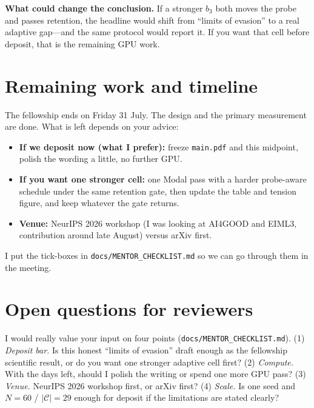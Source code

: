 \documentclass{webofc}
\begin{document}
\textbf{What could change the conclusion.} If a stronger $b_3$ both moves the
probe and passes retention, the headline would shift from ``limits of evasion''
to a real adaptive gap---and the same protocol would report it. If you want
that cell before deposit, that is the remaining GPU work.

\section{Remaining work and timeline}
\label{sec-plan}

The fellowship ends on Friday 31 July. The design and the primary measurement
are done. What is left depends on your advice:
\begin{itemize}
\item \textbf{If we deposit now (what I prefer):} freeze \texttt{main.pdf} and
this midpoint, polish the wording a little, no further GPU.
\item \textbf{If you want one stronger cell:} one Modal pass with a harder
probe-aware schedule under the same retention gate, then update the table and
tension figure, and keep whatever the gate returns.
\item \textbf{Venue:} NeurIPS 2026 workshop (I was looking at AI4GOOD and
EIML3, contribution around late August) versus arXiv first.
\end{itemize}
I put the tick-boxes in \texttt{docs/MENTOR\_CHECKLIST.md} so we can go through
them in the meeting.

\section{Open questions for reviewers}
\label{sec-questions}

I would really value your input on four points
(\texttt{docs/MENTOR\_CHECKLIST.md}).
(1) \emph{Deposit bar.} Is this honest ``limits of evasion'' draft enough as
the fellowship scientific result, or do you want one stronger adaptive cell
first?
(2) \emph{Compute.} With the days left, should I polish the writing or spend
one more GPU pass?
(3) \emph{Venue.} NeurIPS 2026 workshop first, or arXiv first?
(4) \emph{Scale.} Is one seed and $N{=}60$ / $|\mathcal{C}|{=}29$ enough for
deposit if the limitations are stated clearly?
\end{document}
